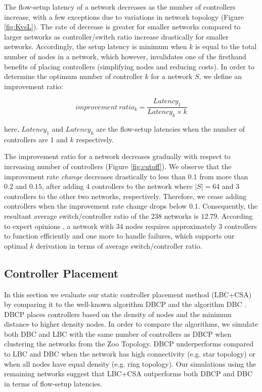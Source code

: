 \documentclass[preprint,12pt]{elsarticle}
\begin{document}
	The flow-setup latency of a network decreases as the number of controllers increase, with a few exceptions due to variations in network topology (Figure \ref{fig:KvsL}). The rate of decrease is greater for smaller networks compared to larger networks as controller/switch ratio increase drastically for smaller networks. Accordingly, the setup latency is minimum when $k$ is equal to the total number of nodes in a network, which however, invalidates one of the firsthand benefits of placing controllers (simplifying nodes and reducing costs). In order to determine the optimum number of controller $k$ for a network $S$, we define an improvement ratio:
	
	\begin{equation}
	improvement~ratio_k = \frac{Latency_1}{Latency_k\times k}
	\end{equation}
	
	here, $Latency_1$ and $Latency_k$ are the flow-setup latencies when the number of controllers are 1 and $k$ respectively.
	
	The improvement ratio for a network decreases gradually with respect to increasing number of controllers (Figure \ref{fig:cutoff}). We observe that the improvement rate \textit{change} decreases drastically to less than $0.1$ from more than $0.2$ and $0.15$, after adding 4 controllers to the network where $|S|=64$ and 3 controllers to the other two networks, respectively. Therefore, we cease adding controllers when the improvement rate change drops below $0.1$. Consequently, the resultant average switch/controller ratio of the 238 networks is $12.79$. According to expert opinions \cite{cpp2012heller}, a network with $34$ nodes requires approximately $3$ controllers to function efficiently and one more to handle failures, which supports our optimal $k$ derivation in terms of average switch/controller ratio.
	
	\subsection{Controller Placement} \label{CPAnalysis}
	In this section we evaluate our static controller placement method (LBC+CSA) by comparing it to the well-known algorithm DBCP \cite{dbcp2017} and the algorithm DBC \cite{aziz2019degree}. DBCP places controllers based on the density of nodes and the minimum distance to higher density nodes. In order to compare the algorithms, we simulate both DBC and LBC with the same number of controllers as DBCP when clustering the networks from the Zoo Topology. DBCP underperforms compared to LBC and DBC when the network has high connectivity (e.g. star topology) or when all nodes have equal density (e.g. ring topology). Our simulations using the remaining networks suggest that LBC+CSA outperforms both DBCP and DBC in terms of flow-setup latencies.
	
\end{document}
